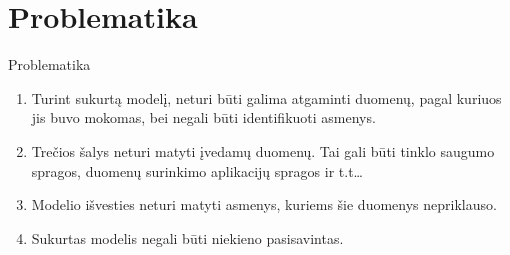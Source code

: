 \section{Problematika}

 \begin{frame}[c]{Problematika}

    \begin{enumerate}
        \item Turint sukurtą modelį, neturi būti galima atgaminti duomenų, pagal kuriuos jis buvo mokomas, bei negali būti identifikuoti asmenys. 
        \item Trečios šalys neturi matyti įvedamų duomenų. Tai gali būti tinklo saugumo spragos, duomenų surinkimo aplikacijų spragos ir t.t…
        \item Modelio išvesties neturi matyti asmenys, kuriems šie duomenys nepriklauso.
        \item Sukurtas modelis negali būti niekieno pasisavintas. 
    \end{enumerate}

 \end{frame}